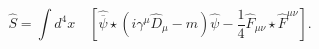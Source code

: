 \begin{equation}
\widehat{S}=\int d^{4}x\quad \left[ \widehat{\overline{\psi }}\star \left(
i\gamma ^{\mu }\widehat{D}_{\mu }-m\right) \widehat{\psi }-\frac{1}{4}%
\widehat{F}_{\mu \nu }\star \widehat{F}^{\mu \nu }\right] .  
\end{equation}

